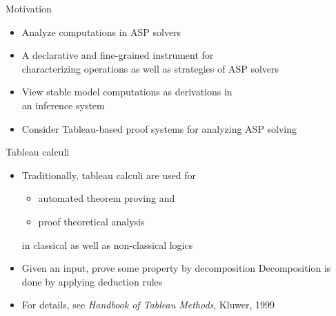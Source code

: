 \begin{frame}{Motivation}
  \bigskip
  \begin{itemize}
  \item<1->  Analyze computations in ASP solvers
    \smallskip
  \item<1-> 
    A declarative and fine-grained instrument for \\ characterizing
    operations as well as strategies of ASP solvers
    \bigskip
  \item<2-> 
    View stable model computations as derivations in\\ an inference system
  \item<3-> [] Consider \alert{Tableau-based proof systems} for analyzing ASP solving
\end{itemize}
\end{frame}
\begin{frame}{Tableau calculi}
  \bigskip
  \begin{itemize}
  \item Traditionally, tableau calculi are used for
    \begin{itemize}
    \item automated theorem proving and
    \item proof theoretical analysis
    \end{itemize}
    in classical as well as non-classical logics
    \medskip
  \item {}
    Given an input, prove some property by decomposition
    Decomposition is done by applying deduction rules
  \item For details, see \emph{Handbook of Tableau Methods}, Kluwer, 1999
  \end{itemize}
\end{frame}
